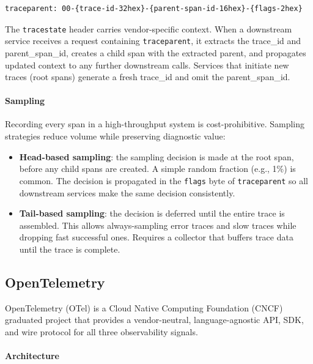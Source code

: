 \begin{verbatim}
traceparent: 00-{trace-id-32hex}-{parent-span-id-16hex}-{flags-2hex}
\end{verbatim}

The \texttt{tracestate} header carries vendor-specific context. When a downstream service receives a request containing \texttt{traceparent}, it extracts the trace\_id and parent\_span\_id, creates a child span with the extracted parent, and propagates updated context to any further downstream calls. Services that initiate new traces (root spans) generate a fresh trace\_id and omit the parent\_span\_id.

\paragraph{Sampling}

Recording every span in a high-throughput system is cost-prohibitive. Sampling strategies reduce volume while preserving diagnostic value:

\begin{itemize}
    \item \textbf{Head-based sampling}: the sampling decision is made at the root span, before any child spans are created. A simple random fraction (e.g., 1\%) is common. The decision is propagated in the \texttt{flags} byte of \texttt{traceparent} so all downstream services make the same decision consistently.
    \item \textbf{Tail-based sampling}: the decision is deferred until the entire trace is assembled. This allows always-sampling error traces and slow traces while dropping fast successful ones. Requires a collector that buffers trace data until the trace is complete.
\end{itemize}

\subsection{OpenTelemetry}

OpenTelemetry (OTel) is a Cloud Native Computing Foundation (CNCF) graduated project that provides a vendor-neutral, language-agnostic API, SDK, and wire protocol for all three observability signals.

\paragraph{Architecture}

